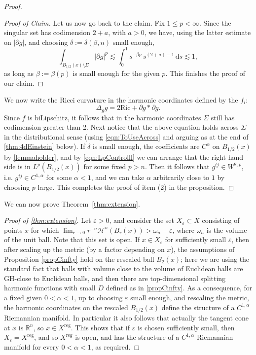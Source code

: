 \documentclass[12pt,a4paper,reqno]{amsart}
\renewcommand{\leq}{\leqslant}
\renewcommand{\epsilon}{\varepsilon}
\begin{document}
\begin{proof}
\begin{proof}[Proof of Claim]
    Let us now go back to the claim. Fix $1\leq p<\infty$.
    Since the singular set has codimension $2+a$, with $a>0$, we have, using the latter estimate on $|\partial g|$, and choosing $\delta:=\delta(\beta,n)$ small enough,
    \begin{equation}\label{eqn:LpControlll}
    \int_{B_{1/2}(x) \setminus \Sigma} |\partial g|^p \lesssim \int_0^1 s^{-\beta p}\, s^{(2+a)-1}\, \mathrm{d}s \lesssim 1, \end{equation}
    as long as $\beta:=\beta(p)$ is small enough for the given $p$. This finishes the proof of our claim.
    \end{proof}
    
    We now write the Ricci curvature in the harmonic coordinates defined by the $f_i$: 
\[ 
\Delta_g g = 2\mathrm{Ric} + \partial g \ast \partial g.
\]
Since $f$ is biLipschitz, it follows that in the harmonic coordinates $\Sigma$ still has codimension greater than 2.
Next notice that the above equation holds across $\Sigma$ in the distributional sense (using \eqref{eqn:ToUseAcross} and arguing as at the end of \cref{thm:4dEinstein} below). If $\delta$ is small enough, the coefficients are $C^\alpha$ on $B_{1/2}(x)$ by \cref{lemmaholder}, and by \eqref{eqn:LpControlll} we can arrange that the right hand side is in $L^p(B_{1/2}(x))$ for some fixed $p > n$. Then it follows that $g^{ij} \in W^{2,p}$, i.e. $g^{ij} \in C^{1,\alpha}$ for some $\alpha < 1$, and we can take $\alpha$ arbitrarily close to $1$ by choosing $p$ large. This completes the proof of item (2) in the proposition. 
\end{proof}

We can now prove Theorem~\ref{thm:extension}.
\begin{proof}[Proof of \cref{thm:extension}]
    Let $\epsilon > 0$, and consider the set $X_\epsilon \subset X$ consisting of points $x$ for which $\lim_{r\to 0} r^{-n} \mathcal{H}^n(B_r(x)) > \omega_n - \epsilon$, where $\omega_n$ is the volume of the unit ball. Note that this set is open. If $x\in X_\epsilon$ for sufficiently small $\epsilon$, then after scaling up the metric (by a factor depending on $x$), the assumptions of Proposition \ref{propCinfty} hold on the rescaled ball $B_2(x)$; here we are using the standard fact that balls with volume close to the volume of Euclidean balls are GH-close to Euclidean balls, and then there are top-dimensional splitting harmonic functions with small $D$ defined as in \cref{propCinfty}. As a consequence, for a fixed given $0<\alpha<1$, up to choosing $\varepsilon$ small enough, and rescaling the metric, the harmonic coordinates on the rescaled $B_{1/2}(x)$ define the structure of a $C^{1,\alpha}$ Riemannian manifold. In particular it also follows that actually the tangent cone at $x$ is $\mathbb{R}^n$, so $x\in X^{\mathrm{reg}}$. This shows that if $\epsilon$ is chosen sufficiently small, then $X_\epsilon = X^{\mathrm{reg}}$, and so $X^{\mathrm{reg}}$ is open, and has the structure of a $C^{1,\alpha}$ Riemannian manifold for every $0<\alpha<1$, as required. 
\end{proof}
\end{document}
